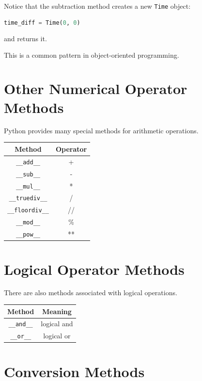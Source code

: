 \documentclass[11pt]{article}
\begin{document}
Notice that the subtraction method creates a new \verb|Time| object:

\begin{lstlisting}[language=Python]
time_diff = Time(0, 0)
\end{lstlisting}

and returns it.

This is a common pattern in object-oriented programming.

\section{Other Numerical Operator Methods}

Python provides many special methods for arithmetic operations.

\begin{center}
\begin{tabular}{cc}
\toprule
Method & Operator \\
\midrule
\verb|__add__| & + \\
\verb|__sub__| & - \\
\verb|__mul__| & * \\
\verb|__truediv__| & / \\
\verb|__floordiv__| & // \\
\verb|__mod__| & \% \\
\verb|__pow__| & ** \\
\bottomrule
\end{tabular}
\end{center}

\section{Logical Operator Methods}

There are also methods associated with logical operations.

\begin{center}
\begin{tabular}{cc}
\toprule
Method & Meaning \\
\midrule
\verb|__and__| & logical and \\
\verb|__or__| & logical or \\
\bottomrule
\end{tabular}
\end{center}

\section{Conversion Methods}
\end{document}
